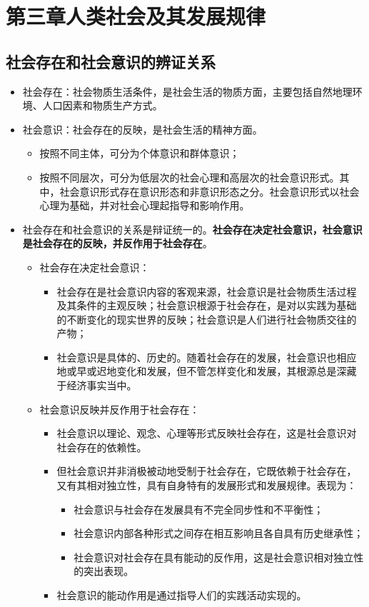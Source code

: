 \documentclass[12pt,openany]{ctexbook}
\begin{document}
\chapter{第三章\quad{}人类社会及其发展规律}
\section{社会存在和社会意识的辨证关系}
\begin{itemize}
  \item 社会存在：社会物质生活条件，是社会生活的物质方面，主要包括自然地理环境、人口因素和物质生产方式。
  \item 社会意识：社会存在的反映，是社会生活的精神方面。
\begin{itemize}
  \item 按照不同主体，可分为个体意识和群体意识；
  \item 按照不同层次，可分为低层次的社会心理和高层次的社会意识形式。其中，社会意识形式存在意识形态和非意识形态之分。社会意识形式以社会心理为基础，并对社会心理起指导和影响作用。
\end{itemize}
  \item 社会存在和社会意识的关系是辩证统一的。\textbf{社会存在决定社会意识，社会意识是社会存在的反映，并反作用于社会存在}。
\begin{itemize}
  \item 社会存在决定社会意识：
\begin{itemize}
  \item 社会存在是社会意识内容的客观来源，社会意识是社会物质生活过程及其条件的主观反映；社会意识根源于社会存在，是对以实践为基础的不断变化的现实世界的反映；社会意识是人们进行社会物质交往的产物；
  \item 社会意识是具体的、历史的。随着社会存在的发展，社会意识也相应地或早或迟地变化和发展，但不管怎样变化和发展，其根源总是深藏于经济事实当中。
\end{itemize}
  \item 社会意识反映并反作用于社会存在：
\begin{itemize}
  \item 社会意识以理论、观念、心理等形式反映社会存在，这是社会意识对社会存在的依赖性。
  \item 但社会意识并非消极被动地受制于社会存在，它既依赖于社会存在，又有其相对独立性，具有自身特有的发展形式和发展规律。表现为：
\begin{itemize}
  \item 社会意识与社会存在发展具有不完全同步性和不平衡性；
  \item 社会意识内部各种形式之间存在相互影响且各自具有历史继承性；
  \item 社会意识对社会存在具有能动的反作用，这是社会意识相对独立性的突出表现。
\end{itemize}
  \item 社会意识的能动作用是通过指导人们的实践活动实现的。
\end{itemize}
\end{itemize}
\end{itemize}
\end{document}
